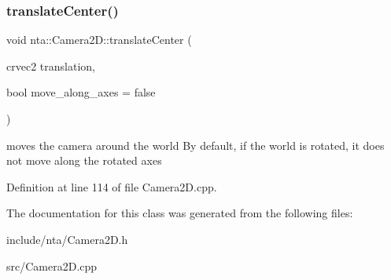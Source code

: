 \subsubsection{\texorpdfstring{translate\+Center()}{translateCenter()}}
{\footnotesize\ttfamily void nta\+::\+Camera2\+D\+::translate\+Center (\begin{DoxyParamCaption}\item[{crvec2}]{translation,  }\item[{bool}]{move\+\_\+along\+\_\+axes = {\ttfamily false} }\end{DoxyParamCaption})}

moves the camera around the world By default, if the world is rotated, it does not move along the rotated axes 

Definition at line 114 of file Camera2\+D.\+cpp.



The documentation for this class was generated from the following files\+:\begin{DoxyCompactItemize}
\item 
include/nta/Camera2\+D.\+h\item 
src/Camera2\+D.\+cpp\end{DoxyCompactItemize}
